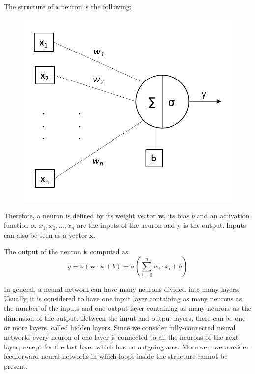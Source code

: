 \documentclass{Configuration_Files/PoliMi3i_thesis}
\begin{document}
The structure of a neuron is the following:
\begin{figure}[H]
    \centering
    \includegraphics[scale=.4,trim={0 0.9cm 0 0},clip]{Images/single_neuron.png}
\end{figure}
Therefore, a neuron is defined by its weight vector $\mathbf{w}$, its bias $b$ and an activation function $\sigma$. $x_1, x_2, ..., x_n$ are the inputs of the neuron and y is the output. Inputs can also be seen as a vector $\mathbf{x}$.

The output of the neuron is computed as:
$$y = \sigma(\mathbf{w} \cdot \mathbf{x} + b) = \sigma(\sum_{i=0}^{n}{w_i \cdot x_i} + b)$$

In general, a neural network can have many neurons divided into many layers.
Usually, it is considered to have one input layer containing as many neurons as the number of the inputs and one output layer containing as many neurons as the dimension of the output.
Between the input and output layers, there can be one or more layers, called hidden layers.
Since we consider fully-connected neural networks every neuron of one layer is connected to all the neurons of the next layer, except for the last layer which has no outgoing arcs.
Moreover, we consider feedforward neural networks in which loops inside the structure cannot be present.
\end{document}
